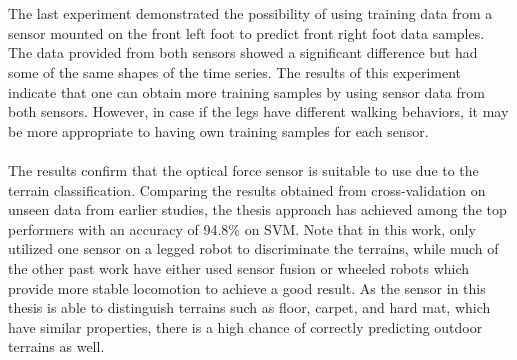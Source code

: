 \documentclass[USenglish]{ifimaster}  %
\begin{document}
\\
\\
The last experiment demonstrated the possibility of using training data from a sensor mounted on the front left foot to predict front right foot data samples. The data provided from both sensors showed a significant difference but had some of the same shapes of the time series. The results of this experiment indicate that one can obtain more training samples by using sensor data from both sensors. However, in case if the legs have different walking behaviors, it may be more appropriate to having own training samples for each sensor. 
\\
\\
The results confirm that the optical force sensor is suitable to use due to the terrain classification. Comparing the results obtained from cross-validation on unseen data from earlier studies, the thesis approach has achieved among the top performers with an accuracy of 94.8\% on SVM. Note that in this work, only utilized one sensor on a legged robot to discriminate the terrains, while much of the other past work have either used sensor fusion or wheeled robots which provide more stable locomotion to achieve a good result. As the sensor in this thesis is able to distinguish terrains such as floor, carpet, and hard mat, which have similar properties, there is a high chance of correctly predicting outdoor terrains as well.
	
\end{document}
